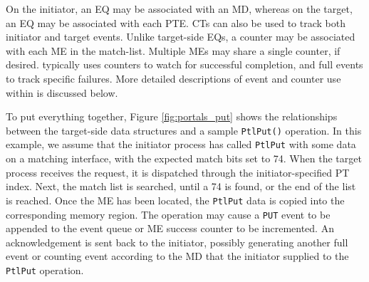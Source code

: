 On the initiator, an EQ may be associated with an MD, whereas on the
target, an EQ may be associated with each PTE.  CTs can also be used to
track both initiator and target events.
Unlike target-side EQs, a counter may be
associated with each ME in the match-list. Multiple MEs may share a
single counter, if desired. \pdht typically uses counters to watch for
successful completion, and full events to track specific failures. More
detailed descriptions of event and counter use within \pdht is
discussed below.

To put everything together, Figure \ref{fig:portals_put} shows the
relationships between the target-side data structures and a sample
{\tt PtlPut()} operation. In this example, we assume that the
initiator process has called {\tt PtlPut} with some data on a matching
interface, with the expected match bits set to 74. When the target
process receives the request, it is dispatched through the
initiator-specified PT index. Next, the match list is searched, until
a 74 is found, or the end of the list is reached. Once the ME has been
located, the {\tt PtlPut} data is copied into the corresponding memory
region. The operation may cause a {\tt PUT} event to be appended to
the event queue or ME success counter to be incremented. An
acknowledgement is sent back to the initiator, possibly generating
another full event or counting event according to the MD that the initiator
supplied to the {\tt PtlPut} operation.




